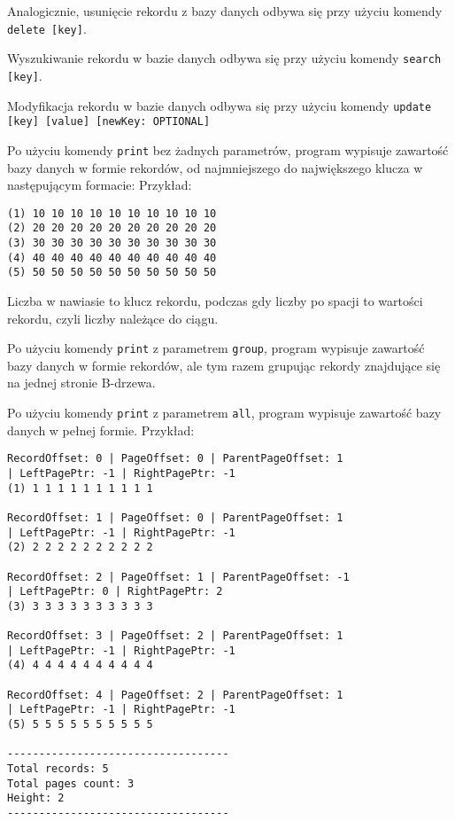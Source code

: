 \documentclass[12pt]{article}
\begin{document}
Analogicznie, usunięcie rekordu z bazy danych odbywa się przy użyciu komendy \verb!delete [key]!.

Wyszukiwanie rekordu w bazie danych odbywa się przy użyciu komendy \verb!search [key]!.

Modyfikacja rekordu w bazie danych odbywa się przy użyciu komendy \verb!update [key] [value] [newKey: OPTIONAL]!

Po użyciu komendy \verb!print! bez żadnych parametrów, program wypisuje zawartość bazy danych w formie rekordów, od najmniejszego
do największego klucza w następującym formacie:
Przykład:
\begin{tcolorbox}[colframe=black!75, colback=white!95, title=Output komendy \texttt{print}]
\begin{verbatim}
(1) 10 10 10 10 10 10 10 10 10 10
(2) 20 20 20 20 20 20 20 20 20 20
(3) 30 30 30 30 30 30 30 30 30 30
(4) 40 40 40 40 40 40 40 40 40 40
(5) 50 50 50 50 50 50 50 50 50 50
\end{verbatim}
\end{tcolorbox}

Liczba w nawiasie to klucz rekordu, podczas gdy liczby po spacji to wartości rekordu, czyli liczby należące do ciągu.

Po użyciu komendy \verb!print! z parametrem \verb!group!, program wypisuje zawartość bazy danych w formie rekordów,
ale tym razem grupując rekordy znajdujące się na jednej stronie B-drzewa.

Po użyciu komendy \verb!print! z parametrem \verb!all!, program wypisuje zawartość bazy danych w pełnej formie. Przykład:
\begin{tcolorbox}[colframe=black!75, colback=white!95, title=Output komendy \texttt{print all}]
\begin{verbatim}
RecordOffset: 0 | PageOffset: 0 | ParentPageOffset: 1 
| LeftPagePtr: -1 | RightPagePtr: -1
(1) 1 1 1 1 1 1 1 1 1 1 

RecordOffset: 1 | PageOffset: 0 | ParentPageOffset: 1 
| LeftPagePtr: -1 | RightPagePtr: -1
(2) 2 2 2 2 2 2 2 2 2 2 

RecordOffset: 2 | PageOffset: 1 | ParentPageOffset: -1 
| LeftPagePtr: 0 | RightPagePtr: 2
(3) 3 3 3 3 3 3 3 3 3 3 

RecordOffset: 3 | PageOffset: 2 | ParentPageOffset: 1 
| LeftPagePtr: -1 | RightPagePtr: -1
(4) 4 4 4 4 4 4 4 4 4 4 

RecordOffset: 4 | PageOffset: 2 | ParentPageOffset: 1 
| LeftPagePtr: -1 | RightPagePtr: -1
(5) 5 5 5 5 5 5 5 5 5 5 

-----------------------------------
Total records: 5
Total pages count: 3
Height: 2
-----------------------------------
\end{verbatim}
\end{tcolorbox}
\end{document}
